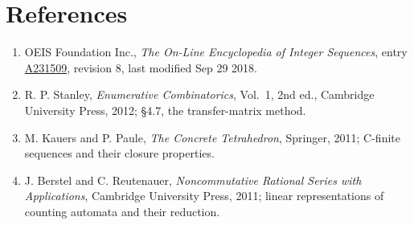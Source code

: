 \documentclass[11pt]{article}
\theoremstyle{definition}
\begin{document}
\section{References}

\begin{enumerate}

\item OEIS Foundation Inc., \emph{The On-Line Encyclopedia of Integer Sequences}, entry \href{https://oeis.org/A231509}{A231509}, revision 8, last modified Sep 29 2018.

\item R. P. Stanley, \emph{Enumerative Combinatorics}, Vol.~1, 2nd ed., Cambridge University Press, 2012; \S4.7, the transfer-matrix method.

\item M. Kauers and P. Paule, \emph{The Concrete Tetrahedron}, Springer, 2011; C-finite sequences and their closure properties.

\item J. Berstel and C. Reutenauer, \emph{Noncommutative Rational Series with Applications}, Cambridge University Press, 2011; linear representations of counting automata and their reduction.

\end{enumerate}
\end{document}
